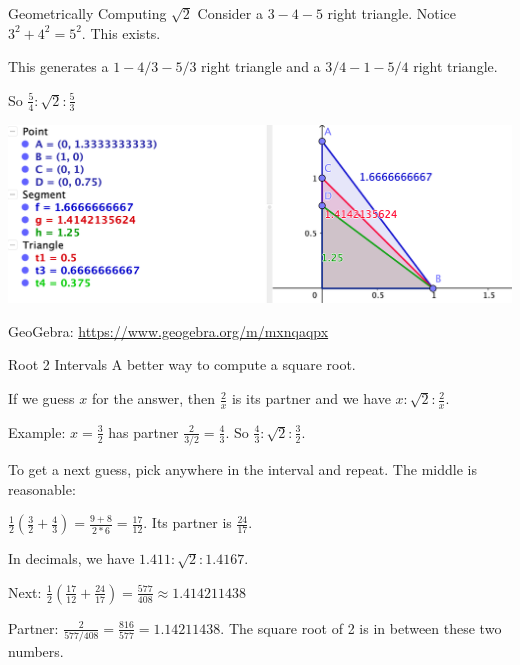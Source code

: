 \documentclass{beamer}
\begin{document}
\begin{frame}{Geometrically Computing $\sqrt{2}$}
    Consider a $3-4-5$ right triangle. Notice $3^2 + 4^2 = 5^2$. This exists. 

    This generates a $1 - 4/3 - 5/3$ right triangle and a $3/4 -1 - 5/4$ right triangle. 

    So  $\frac{5}{4} : \sqrt{2} : \frac{5}{3}$

    \includegraphics[width=\textwidth]{Images/pythagoras-sqrt-2.png}

    GeoGebra: \url{https://www.geogebra.org/m/mxnqaqpx}
    
\end{frame}


\begin{frame}{Root 2 Intervals}
    A better way to compute a square root.

    If we guess $x$ for the answer, then $\frac{2}{x}$ is its partner and we have $x : \sqrt{2} : \frac{2}{x}$.  

    Example: $x=\frac{3}{2}$ has partner $\frac{2}{3/2} = \frac{4}{3}$. So $\frac{4}{3} : \sqrt{2} : \frac{3}{2}$.

    To get a next guess, pick anywhere in the interval and repeat. The middle is reasonable: 

    $\frac{1}{2} (\frac{3}{2} + \frac{4}{3}) =  \frac{9 + 8}{2*6} = \frac{17}{12}$. Its partner is $\frac{24}{17}$.  

    In decimals, we have $1.411 : \sqrt{2} : 1.4167$. 

    Next:  $\frac{1}{2} (\frac{17}{12} + \frac{24}{17} ) =  \frac{577}{408} \approx 1.414211438$

    Partner:  $\frac{2}{577/408} = \frac{816}{577} = 1.14211438$. The square root of 2 is in between these two numbers. 
    
\end{frame}
\end{document}

